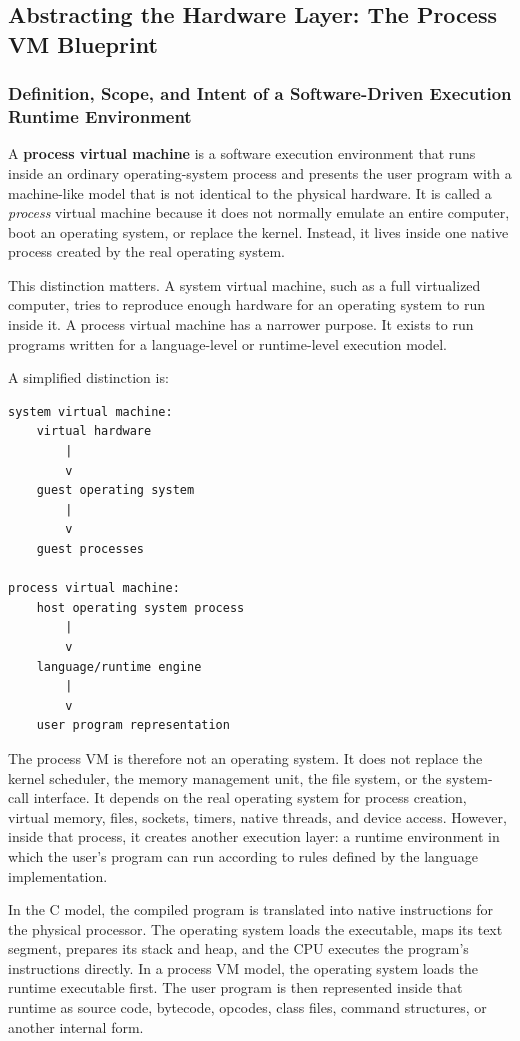 \subsection{Abstracting the Hardware Layer: The Process VM Blueprint}



\subsubsection{Definition, Scope, and Intent of a Software-Driven Execution Runtime Environment}

A \textbf{process virtual machine} is a software execution environment that runs inside an ordinary operating-system process and presents the user program with a machine-like model that is not identical to the physical hardware. It is called a \emph{process} virtual machine because it does not normally emulate an entire computer, boot an operating system, or replace the kernel. Instead, it lives inside one native process created by the real operating system.

This distinction matters. A system virtual machine, such as a full virtualized computer, tries to reproduce enough hardware for an operating system to run inside it. A process virtual machine has a narrower purpose. It exists to run programs written for a language-level or runtime-level execution model.

A simplified distinction is:

\begin{verbatim}
system virtual machine:
    virtual hardware
        |
        v
    guest operating system
        |
        v
    guest processes

process virtual machine:
    host operating system process
        |
        v
    language/runtime engine
        |
        v
    user program representation
\end{verbatim}

The process VM is therefore not an operating system. It does not replace the kernel scheduler, the memory management unit, the file system, or the system-call interface. It depends on the real operating system for process creation, virtual memory, files, sockets, timers, native threads, and device access. However, inside that process, it creates another execution layer: a runtime environment in which the user's program can run according to rules defined by the language implementation.

In the C model, the compiled program is translated into native instructions for the physical processor. The operating system loads the executable, maps its text segment, prepares its stack and heap, and the CPU executes the program's instructions directly. In a process VM model, the operating system loads the runtime executable first. The user program is then represented inside that runtime as source code, bytecode, opcodes, class files, command structures, or another internal form.

